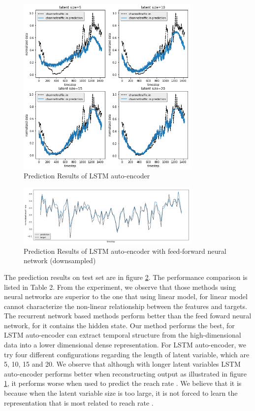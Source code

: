 \documentclass[5p]{elsarticle}
\newcommand{\dabiaolv}{reach rate }
\begin{document}
\begin{figure}[h]
    \centering
    \includegraphics[width=0.8\textwidth]{lstm_auto_encoder_result.png}
    \caption{Prediction Results of LSTM auto-encoder}
    \label{fig:prediction_Results_of_LSTM_auto_encoder}
\end{figure}

\begin{figure}[h]
    \centering
    \includegraphics[width=0.8\textwidth]{result.png}
    \caption{Prediction Results of LSTM auto-encoder with feed-forward neural network (downsampled)}
    \label{fig:prediction_results}
\end{figure}

The prediction results on test set are in figure \ref{fig:prediction_results}. The performance comparison is listed in Table 2. From the experiment, we observe that those methods using neural networks are superior to the one that using linear model, for linear model cannot characterize the non-linear relationship between the features and targets. The recurrent network based methods perform better than the feed foward neural network, for it contains the hidden state. Our method performs the best, for LSTM auto-encoder can extract temporal structure from the high-dimensional data into a lower dimensional dense representation. For LSTM auto-encoder, we try four different configurations regarding the length of latent variable, which are 5, 10, 15 and 20. We observe that although with longer latent variables LSTM auto-encoder performs better when reconstructing output as illustrated in figure \ref{fig:prediction_Results_of_LSTM_auto_encoder}, it performs worse when used to predict the \dabiaolv. We believe that it is because when the latent variable size is too large, it is not forced to learn the representation that is most related to \dabiaolv.     
 
\end{document}
